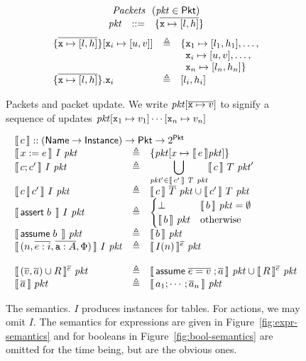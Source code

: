 \begin{figure}[tpb]
  \[\begin{array}{lcl}
      \multicolumn 3 c {\mathit{Packets}~~(\pkt \in \Pkt)} \\
      \pkt
      &::=
      & \{\overline{\var x \mapsto [l,h]}\}
    \end{array}
  \]
  \[\begin{array}{r@{\hspace{0em}}lcl}
      \{\overline{\var x \mapsto [l,h]}\}&[\var x_i \mapsto [u,v]]
      & \triangleq
      & \{\var x_1 \mapsto [l_1,h_1], \ldots,\\
      &&& \phantom{\{}\var x_i \mapsto [u,v], \ldots, \\
      &&& \phantom{\{}\var x_n\mapsto [l_n,h_n]\}\\
      \{\overline{\var x \mapsto [l,h]}\}&.\var x_i
      &\triangleq
      &[l_i, h_i]
    \end{array}
  \]
  \caption{Packets and packet update. We write
    $\mathit{pkt}[\overline{\texttt{x} \mapsto v}]$ to signify a sequence of
  updates $\mathit{pkt}[\texttt{x}_1 \mapsto v_1]\cdots[\texttt{x}_n \mapsto v_n]$}
  \label{fig:packets}
\end{figure}
\begin{figure}
  \[\begin{array}{lcl}
      \multicolumn 3 l {\bracbb{c}:: (\Name \to \Instance) \to \Pkt \to 2^\Pkt}\\
      \bracbb{x:=e}~I~\pkt &\triangleq& \{\pkt[x \mapsto \bracbb{e} \pkt]\} \\
      \bracbb{c;c'}~I~\pkt & \triangleq& \displaystyle \bigcup_{\pkt' \in \bracbb{c'}~T~\pkt}\bracbb{c}~T~\pkt' \\
      \bracbb{c\angel c'}~I~\pkt & \triangleq & \bracbb{c}~\vec T~\pkt \cup \bracbb{c'}~T~\pkt\\
      \bracbb{\assert b}~I~\pkt & \triangleq & \begin{cases}
        \bot & \bracbb{b}~\pkt = \emptyset \\
        \bracbb{b}~\pkt & \textrm{otherwise}
      \end{cases} \\
      \bracbb{\assume b}~\pkt & \triangleq &\bracbb{b}~\pkt\\
      \bracbb{(n,\vec{e : i}, \vec{\var a : A}, \Phi)}~I~\pkt &\triangleq & \bracbb{I(n)}^{\vec{e}}~\pkt \\\\
      \bracbb{(\vec v, \vec a)\cup R}^{\vec{e}}~\pkt & \triangleq &
                                                                    \bracbb{\assume{\vec{e = v}}; \vec a}~\pkt \cup \bracbb{R}^{\vec{e}}~\pkt \\
      \bracbb{\vec a}~pkt & \triangleq & \bracbb{a_1;\cdots;\vec a_n}~\pkt\\
    \end{array}
  \]

  \caption{The semantics. $I$ produces instances for tables. For
    actions, we may omit $I$. The semantics for expressions are given
    in Figure~\ref{fig:expr-semantics} and for booleans in
    Figure~\ref{fig:bool-semantics} are omitted for the time being,
    but are the obvious ones.}
  \label{fig:semantics}
\end{figure}


